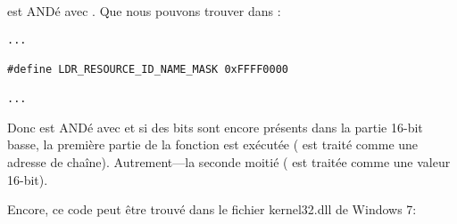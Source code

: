  est ANDé avec . Que nous pouvons trouver
dans :

\begin{lstlisting}[style=customc]
...

#define LDR_RESOURCE_ID_NAME_MASK 0xFFFF0000

...
\end{lstlisting}

Donc  est ANDé avec  et si des bits sont encore présents
dans la partie 16-bit basse, la première partie de la fonction est exécutée ( 
est traité comme une adresse de chaîne).
Autrement---la seconde moitié ( est traitée comme une valeur 16-bit).

Encore, ce code peut être trouvé dans le fichier kernel32.dll de Windows 7:

